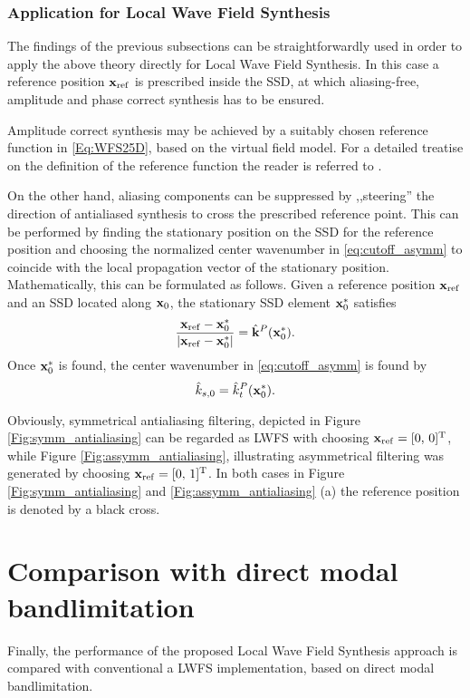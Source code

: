 \documentclass[conference]{IEEEtran}
\begin{document}
\subsubsection{Application for Local Wave Field Synthesis}
The findings of the previous subsections can be straightforwardly used in order to apply the above theory directly for Local Wave Field Synthesis.
In this case a reference position $\mathbf{x}_{\mathrm{ref}}$ is prescribed inside the SSD, at which aliasing-free, amplitude and phase correct synthesis has to be ensured.

Amplitude correct synthesis may be achieved by a suitably chosen reference function in \eqref{Eq:WFS25D}, based on the virtual field model.
For a detailed treatise on the definition of the reference function the reader is referred to \cite{Firtha2019phd}.

On the other hand, aliasing components can be suppressed by ,,steering'' the direction of antialiased synthesis to cross the prescribed reference point.
This can be performed by finding the stationary position on the SSD for the reference position and choosing the normalized center wavenumber in \eqref{eq:cutoff_asymm} to coincide with the local propagation vector of the stationary position.
Mathematically, this can be formulated as follows.
Given a reference position $\mathbf{x}_{\mathrm{ref}}$ and an SSD located along $\mathbf{x}_0$, the stationary SSD element $\mathbf{x}_0^*$ satisfies
\begin{equation}
    \frac{\mathbf{x}_{\mathrm{ref}} - \mathbf{x}_0^*}{\left| \mathbf{x}_{\mathrm{ref}} - \mathbf{x}_0^* \right|} = \hat{\mathbf{k}}^P(\mathbf{x}_0^*).
\end{equation}
Once $\mathbf{x}_0^*$ is found, the center wavenumber in \eqref{eq:cutoff_asymm} is found by
\begin{equation}
    \hat{k}_{s,0} = \hat{k}_t^P(\mathbf{x}_0^*).
\end{equation}

Obviously, symmetrical antialiasing filtering, depicted in Figure \ref{Fig:symm_antialiasing} can be regarded as LWFS with choosing $\mathbf{x}_{\mathrm{ref}} = [0, \, 0]^{\mathrm{T}}$,
while Figure \ref{Fig:assymm_antialiasing}, illustrating asymmetrical filtering was generated by choosing $\mathbf{x}_{\mathrm{ref}} = [0, \, 1]^{\mathrm{T}}$.
In both cases in Figure \ref{Fig:symm_antialiasing} and \ref{Fig:assymm_antialiasing} (a) the reference position is denoted by a black cross.

\section{Comparison with direct modal bandlimitation}
Finally, the performance of the proposed Local Wave Field Synthesis approach is compared with conventional a LWFS implementation, based on direct modal bandlimitation.
\end{document}
